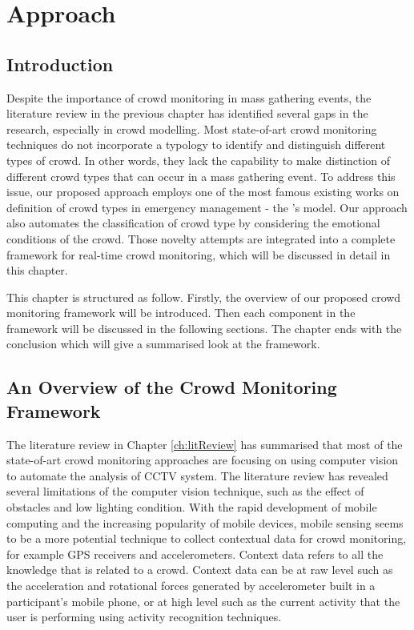 \chapter{Approach}
\label{ch:approach}
\ifpdf
\graphicspath{{Chapter3/Figs/Raster/}{Chapter3/Figs/PDF/}{Chapter3/Figs/}}
\else
\graphicspath{{Chapter3/Figs/Vector/}{Chapter3/Figs/}}
\fi

\section{Introduction}
\label{sec:approachIntro}
Despite the importance of crowd monitoring in mass gathering events, the literature review in the previous chapter has identified several gaps in the research, especially in crowd modelling. Most state-of-art crowd monitoring techniques do not incorporate a typology to identify and distinguish different types of crowd. In other words, they lack the capability to make distinction of different crowd types that can occur in a mass gathering event. To address this issue, our proposed approach employs one of the most famous existing works on definition of crowd types in emergency management - the \citet{Berlonghi1995}'s model. Our approach also automates the classification of crowd type by considering the emotional conditions of the crowd. Those novelty attempts are integrated into a complete framework for real-time crowd monitoring, which will be discussed in detail in this chapter.

This chapter is structured as follow. Firstly, the overview of our proposed crowd monitoring framework will be introduced. Then each component in the framework will be discussed in the following sections. The chapter ends with the conclusion which will give a summarised look at the framework.

\section{An Overview of the Crowd Monitoring Framework}

The literature review in Chapter \ref{ch:litReview} has summarised that most of the state-of-art crowd monitoring approaches are focusing on using computer vision to automate the analysis of CCTV system. The literature review has revealed several limitations of the computer vision technique, such as the effect of obstacles and low lighting condition. With the rapid development of mobile computing and the increasing popularity of mobile devices, mobile sensing seems to be a more potential technique to collect contextual data for crowd monitoring, for example GPS receivers and accelerometers. Context data refers to all the knowledge that is related to a crowd. Context data can be at raw level such as the acceleration and rotational forces generated by accelerometer built in a participant's mobile phone, or at high level such as the current activity that the user is performing using activity recognition techniques.

